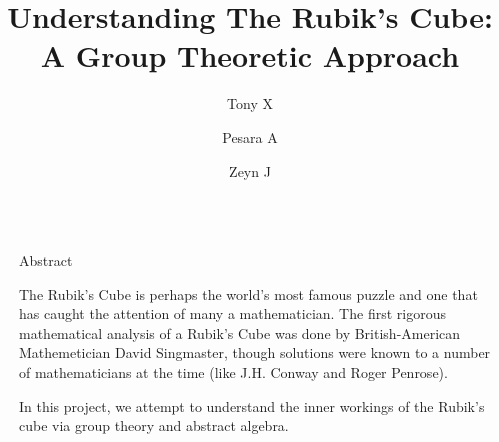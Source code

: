 \documentclass[final]{beamer}
\title{Understanding The Rubik's Cube: A Group Theoretic Approach}
\author{Tony X \and Pesara A  \and Zeyn J}
\newlength{\sepwidth}
\newlength{\colwidth}
\newcommand{\separatorcolumn}{\begin{column}{\sepwidth}\end{column}}
\begin{document}
\pgfmathsetmacro{}
\newcommand{\frontcolor}{red}
\newcommand{\sidecolor}{blue}
\begin{frame}[t]
\begin{columns}[t]
\separatorcolumn

\begin{column}{\colwidth}

  \begin{block}{Abstract}



    The Rubik's Cube is perhaps the world's most famous puzzle and one that has caught the attention of many a mathematician. 
    The first rigorous 
    mathematical analysis of a Rubik's Cube was done by British-American Mathemetician 
    David Singmaster, though solutions were known to a number of 
    mathematicians at the time (like J.H. Conway and Roger Penrose).  

    In this project, we attempt to understand the inner workings of the Rubik's cube via group theory and abstract algebra. 


\end{block}
\end{column}
\end{columns}
\end{frame}
\end{document}
